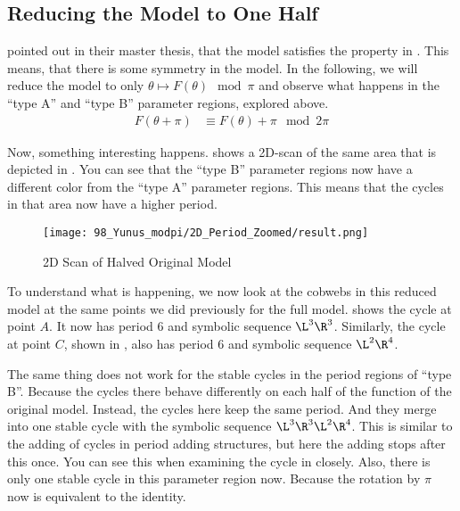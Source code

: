 \subsection{Reducing the Model to One Half}
\label{sec:og.halved}

 pointed out in their master thesis, that the model satisfies the property in .
This means, that there is some symmetry in the model.
In the following, we will reduce the model to only $\theta \mapsto F(\theta) \mod \pi$ and observe what happens in the ``type A'' and ``type B'' parameter regions, explored above.
\begin{align}
	F(\theta + \pi) & \equiv F(\theta) + \pi \mod 2 \pi \label{equ:yunus.property.symmetry}
\end{align}

Now, something interesting happens.
 shows a 2D-scan of the same area that is depicted in .
You can see that the ``type B'' parameter regions now have a different color from the ``type A'' parameter regions.
This means that the cycles in that area now have a higher period.

\begin{figure}
	\centering
	\texttt{[image: 98\_Yunus\_modpi/2D\_Period\_Zoomed/result.png]}
	\caption{2D Scan of Halved Original Model}
	\label{fig:yunus.pi.2d.full}
\end{figure}

To understand what is happening, we now look at the cobwebs in this reduced model at the same points we did previously for the full model.
 shows the cycle at point $A$.
It now has period 6 and symbolic sequence $\L^3\R^3$.
Similarly, the cycle at point $C$, shown in , also has period 6 and symbolic sequence $\L^2\R^4$.

The same thing does not work for the stable cycles in the period regions of ``type B''.
Because the cycles there behave differently on each half of the function of the original model.
Instead, the cycles here keep the same period.
And they merge into one stable cycle with the symbolic sequence $\L^3\R^3\L^2\R^4$.
This is similar to the adding of cycles in period adding structures, but here the adding stops after this once.
You can see this when examining the cycle in  closely.
Also, there is only one stable cycle in this parameter region now.
Because the rotation by $\pi$ now is equivalent to the identity.

